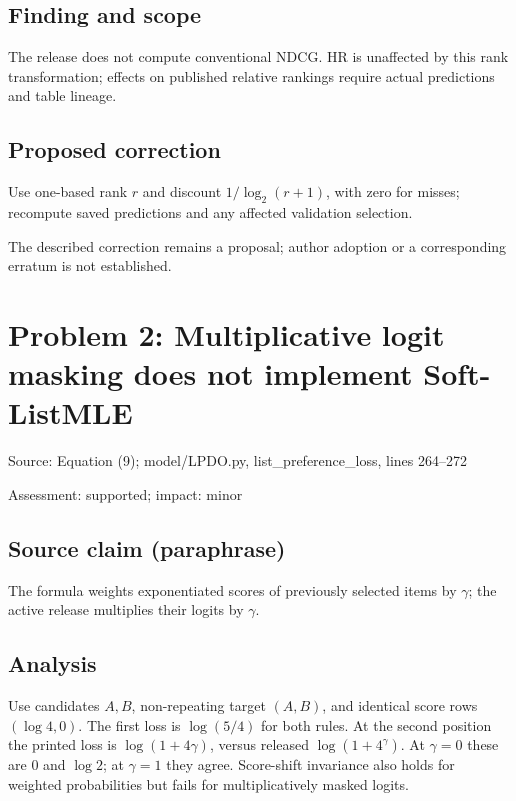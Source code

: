 \documentclass[11pt]{article}
\begin{document}
\subsection*{Finding and scope}

The release does not compute conventional NDCG. HR is unaffected by this rank transformation; effects on published relative rankings require actual predictions and table lineage.

\subsection*{Proposed correction}

Use one-based rank \(r\) and discount \(1/\log_2(r+1)\), with zero for misses; recompute saved predictions and any affected validation selection.

The described correction remains a proposal; author adoption or a corresponding erratum is not established.

\section*{Problem 2: Multiplicative logit masking does not implement Soft-ListMLE}

Source: Equation (9); model/LPDO.py, list\_preference\_loss, lines 264–272

Assessment: supported; impact: minor

\subsection*{Source claim (paraphrase)}

The formula weights exponentiated scores of previously selected items by \(\gamma\); the active release multiplies their logits by \(\gamma\).

\subsection*{Analysis}

Use candidates \(A,B\), non-repeating target \((A,B)\), and identical score rows \((\log4,0)\). The first loss is \(\log(5/4)\) for both rules. At the second position the printed loss is \(\log(1+4\gamma)\), versus released \(\log(1+4^\gamma)\). At \(\gamma=0\) these are \(0\) and \(\log2\); at \(\gamma=1\) they agree. Score-shift invariance also holds for weighted probabilities but fails for multiplicatively masked logits.
\end{document}
